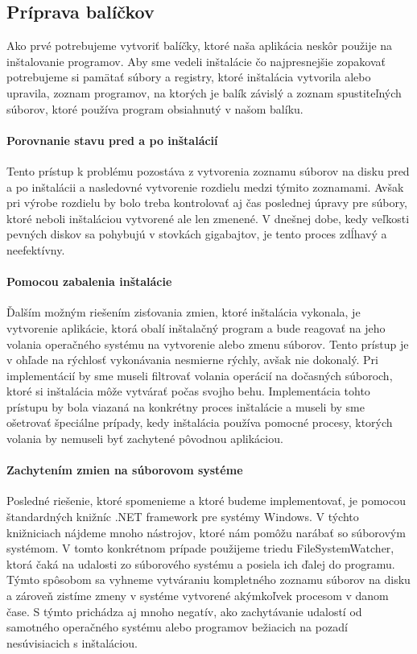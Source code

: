\subsection{Príprava balíčkov}
Ako prvé potrebujeme vytvoriť balíčky, ktoré naša aplikácia neskôr použije na inštalovanie programov. Aby sme vedeli inštalácie čo najpresnejšie zopakovať potrebujeme si pamätať súbory a registry, ktoré inštalácia vytvorila alebo upravila, zoznam programov, na ktorých je balík závislý a zoznam spustiteľných súborov, ktoré používa program obsiahnutý v našom balíku.

\paragraph{Porovnanie stavu pred a po inštalácií}
Tento prístup k problému pozostáva z vytvorenia zoznamu súborov na disku pred a po inštalácii a nasledovné vytvorenie rozdielu medzi týmito zoznamami. Avšak pri výrobe rozdielu by bolo treba kontrolovať aj čas poslednej úpravy pre súbory, ktoré neboli inštaláciou vytvorené ale len zmenené. V dnešnej dobe, kedy veľkosti pevných diskov sa pohybujú v stovkách gigabajtov, je tento proces zdĺhavý a neefektívny. 
\paragraph{Pomocou zabalenia inštalácie}
Ďalším možným riešením zisťovania zmien, ktoré inštalácia vykonala, je vytvorenie aplikácie, ktorá obalí inštalačný program a bude reagovať na jeho volania operačného systému na vytvorenie alebo zmenu súborov. Tento prístup je v ohľade na rýchlosť vykonávania nesmierne rýchly, avšak nie dokonalý. Pri implementácií by sme museli filtrovať volania operácií na dočasných súboroch, ktoré si inštalácia môže vytvárať počas svojho behu. Implementácia tohto prístupu by bola viazaná na konkrétny proces inštalácie a museli by sme ošetrovať špeciálne prípady, kedy inštalácia používa pomocné procesy, ktorých volania by nemuseli byť zachytené pôvodnou aplikáciou. 
\paragraph{Zachytením zmien na súborovom systéme}
Posledné riešenie, ktoré spomenieme a ktoré budeme implementovať, je pomocou štandardných knižníc .NET framework pre systémy Windows. V týchto knižniciach nájdeme mnoho nástrojov, ktoré nám pomôžu narábať so súborovým systémom. V tomto konkrétnom prípade použijeme triedu FileSystemWatcher, ktorá čaká na udalosti zo súborového systému a posiela ich ďalej do programu. Týmto spôsobom sa vyhneme vytváraniu kompletného zoznamu súborov na disku a zároveň zistíme zmeny v systéme vytvorené akýmkoľvek procesom v danom čase. S týmto prichádza aj mnoho negatív, ako zachytávanie udalostí od samotného operačného systému alebo programov bežiacich na pozadí nesúvisiacich s inštaláciou. 
